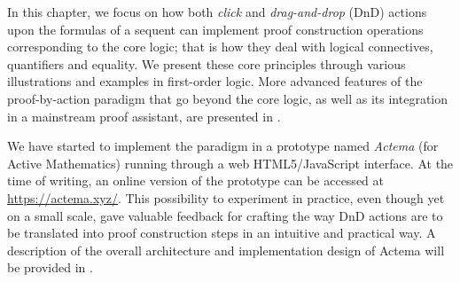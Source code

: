


In this chapter, we focus on how both \emph{click} and \emph{drag-and-drop}
(DnD) actions upon the formulas of a sequent can implement proof construction
operations corresponding to the core logic; that is how they deal with logical
connectives, quantifiers and equality. We present these core principles through
various illustrations and examples in first-order logic.
More advanced features of the proof-by-action paradigm that go beyond the core
logic, as well as its integration in a mainstream proof assistant, are presented
in .

We have started to implement the paradigm in a prototype named {\em Actema} (for
Active Mathematics) running through a web HTML5/JavaScript interface. At the
time of writing, an online version of the prototype can be accessed at
\url{https://actema.xyz/}. This possibility to experiment in
practice, even though yet on a small scale, gave valuable feedback for crafting
the way DnD actions are to be translated into proof construction steps in an
intuitive and practical way. A description of the overall architecture and
implementation design of Actema will be provided in .

